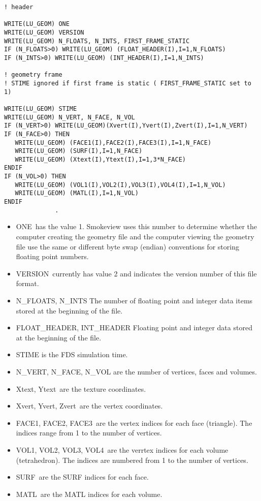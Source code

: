 \documentclass[12pt]{article}
\begin{document}
\begin{lstlisting}
! header

WRITE(LU_GEOM) ONE
WRITE(LU_GEOM) VERSION
WRITE(LU_GEOM) N_FLOATS, N_INTS, FIRST_FRAME_STATIC
IF (N_FLOATS>0) WRITE(LU_GEOM) (FLOAT_HEADER(I),I=1,N_FLOATS)
IF (N_INTS>0) WRITE(LU_GEOM) (INT_HEADER(I),I=1,N_INTS)

! geometry frame
! STIME ignored if first frame is static ( FIRST_FRAME_STATIC set to 1)

WRITE(LU_GEOM) STIME
WRITE(LU_GEOM) N_VERT, N_FACE, N_VOL
IF (N_VERT>0) WRITE(LU_GEOM)(Xvert(I),Yvert(I),Zvert(I),I=1,N_VERT)
IF (N_FACE>0) THEN
   WRITE(LU_GEOM) (FACE1(I),FACE2(I),FACE3(I),I=1,N_FACE)
   WRITE(LU_GEOM) (SURF(I),I=1,N_FACE)
   WRITE(LU_GEOM) (Xtext(I),Ytext(I),I=1,3*N_FACE)
ENDIF
IF (N_VOL>0) THEN
   WRITE(LU_GEOM) (VOL1(I),VOL2(I),VOL3(I),VOL4(I),I=1,N_VOL)
   WRITE(LU_GEOM) (MATL(I),I=1,N_VOL)
ENDIF
              .
\end{lstlisting}

\begin{itemize}
\item {\ct ONE}\ has the value 1. Smokeview uses this number to determine whether the computer creating the geometry file and the computer viewing the geometry file use the same or different byte swap (endian) conventions for storing floating point numbers.
\item {\ct VERSION}\ currently has value 2 and indicates the version number of this file format.
\item {\ct N\_FLOATS, N\_INTS} The number of floating point and integer data items stored at the beginning of the file.
\item {\ct FLOAT\_HEADER, INT\_HEADER} Floating point and integer data stored at the beginning of the file.
\item {\ct STIME} is the FDS simulation time.
\item {\ct N\_VERT, N\_FACE, N\_VOL}  are the number of vertices, faces and volumes.
\item {\ct Xtext, Ytext}\ are the texture coordinates.
\item {\ct Xvert, Yvert, Zvert}\ are the vertex coordinates.
\item {\ct FACE1, FACE2, FACE3}\ are the vertex indices for each face (triangle).
    The indices range from 1 to the
    number of vertices.
\item {\ct VOL1, VOL2, VOL3, VOL4}\ are the verrtex indices for each volume (tetrahedron).  The indices are numbered from 1 to the number of vertices.
\item {\ct SURF}\ are the SURF indices for each face.
\item {\ct MATL}\ are the MATL indices for each volume.
\end{itemize}
\end{document}
